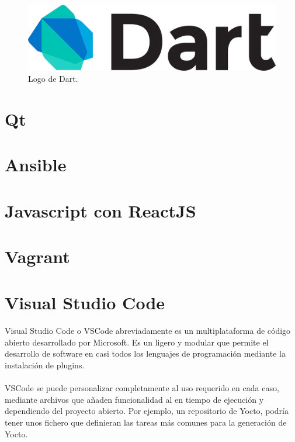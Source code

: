 \begin{figure}[H]
	\centering
	\includegraphics[width=0.50\linewidth]{imgs/dart-logo}
	\caption[Dart Logo]{Logo de Dart.}
	\label{fig:dart}
\end{figure}

\section{Qt}\label{sec:Qt}

\section{Ansible}\label{sec:ansible}

\section{Javascript con ReactJS}\label{sec:reactjs}

\section{Vagrant}\label{sec:vagrant}

\section{Visual Studio Code}\label{sec:vscode}

\paragraph{}Visual Studio Code o VSCode abreviadamente es un  multiplataforma
de código abierto desarrollado por Microsoft. Es un  ligero y modular
que permite el desarrollo de software en casi todos los lenguajes de programación mediante
la instalación de \gls{plugins}.

\paragraph{}VSCode se puede personalizar completamente al uso requerido en cada caso,
mediante archivos que añaden funcionalidad al  en tiempo de ejecución
y dependiendo del proyecto abierto. Por ejemplo, un repositorio de Yocto, podría tener unos
fichero que definieran las tareas más comunes para la generación de Yocto.

